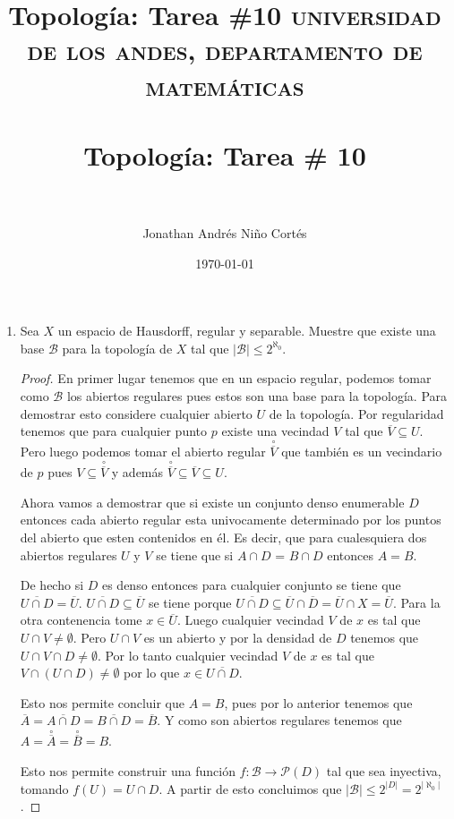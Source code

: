 \documentclass[paper=letter, fontsize=11pt]{scrartcl} %
\title{Topología: Tarea \#10}
\title{	
\normalfont \normalsize 
\textsc{universidad de los andes, departamento de matemáticas} \\ [25pt] %
\horrule{0.5pt} \\[0.4cm] %
\huge Topología: Tarea \# 10 \\ %
\horrule{2pt} \\[0.5cm] %
}
\author{Jonathan Andrés Niño Cortés} %
\date{\normalsize\today} %
\numberwithin{equation}{section} %
\numberwithin{figure}{section} %
\numberwithin{table}{section} %
\begin{document}
\maketitle
\begin{enumerate}
\item Sea $ X $ un espacio de Hausdorff, regular y separable. Muestre que existe una base $ \mathcal{B} $ para la topología de $ X $ tal que $ |\mathcal{B}|\leq 2^{\aleph_0} $.

\begin{proof}
En primer lugar tenemos que en un espacio regular, podemos tomar como $ \mathcal{B} $ los abiertos regulares pues estos  son una base para la topología. Para demostrar esto considere cualquier abierto $ U $ de la topología. Por regularidad tenemos que para cualquier punto $ p $ existe una vecindad $ V $ tal que $ \overline{V} \subseteq U $. Pero luego podemos tomar el abierto regular $ \overset{\circ}{\overline{V}} $ que también es un vecindario de $ p $ pues $ V \subseteq \overset{\circ}{\overline{V}} $ y además $ \overset{\circ}{\overline{V}} \subseteq \overline{V} \subseteq U $.

Ahora vamos a demostrar que si existe un conjunto denso enumerable $ D $ entonces cada abierto regular esta univocamente determinado por los puntos del abierto que esten contenidos en él. Es decir, que para cualesquiera dos abiertos regulares $ U $ y $ V $ se tiene que si $ A \cap D $ = $ B\cap D $ entonces $ A = B $.

De hecho si $ D $ es denso entonces para cualquier conjunto se tiene que $ \overline{U \cap D} = \overline{U} $. $ \overline{U \cap D} \subseteq \overline{U} $ se tiene porque $ \overline{U\cap D} \subseteq \overline{U} \cap \overline{D} = \overline{U} \cap X = \overline{U} $. Para la otra contenencia tome $ x \in \overline{U} $. Luego cualquier vecindad $ V $ de $ x $ es tal que $ U \cap V \not = \emptyset $. Pero $ U \cap V $ es un abierto y por la densidad de $ D $ tenemos que $ U \cap V \cap D \not = \emptyset $. Por lo tanto cualquier vecindad $ V $ de $ x $ es tal que $ V \cap (U \cap D) \not = \emptyset $ por lo que $ x \in \overline{U \cap D} $.

Esto nos permite concluir que $ A = B $, pues por lo anterior tenemos que $ \overline{A}=\overline{A \cap D} = \overline{B \cap D}= \overline{B} $. Y como son abiertos regulares tenemos que $ A = \overset{\circ}{\overline{A}} = \overset{\circ}{\overline{B}} = B $.

Esto nos permite construir una función $ f:\mathcal{B} \to \mathcal{P}(D)  $ tal que sea inyectiva, tomando $ f(U)=U\cap D $. A partir de esto concluimos que $ |\mathcal{B}|\leq 2^{|D|}=2^{|\aleph_0|} $.
\end{proof}


\end{enumerate}
\end{document}
